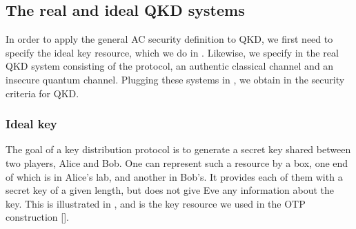 \subsection{The real and ideal QKD systems}
\label{sec:qkd.overview}

In order to apply the general AC security definition to QKD, we first need to specify the ideal key resource, which we do in . Likewise, we specify in  the real QKD system consisting of the protocol, an authentic classical channel and an insecure quantum channel. Plugging these systems in , we obtain in  the security criteria for QKD.


\subsubsection{Ideal key}
\label{sec:qkd.ideal}

The goal of a key distribution protocol is to generate a secret key shared between two players, Alice and Bob. One can represent such a resource by a box, one end of which is in Alice's lab, and another in Bob's. It provides each of them with a secret key of a given length, but does not give Eve any information about the key. This is illustrated in , and is the key resource we used in the OTP construction [].


